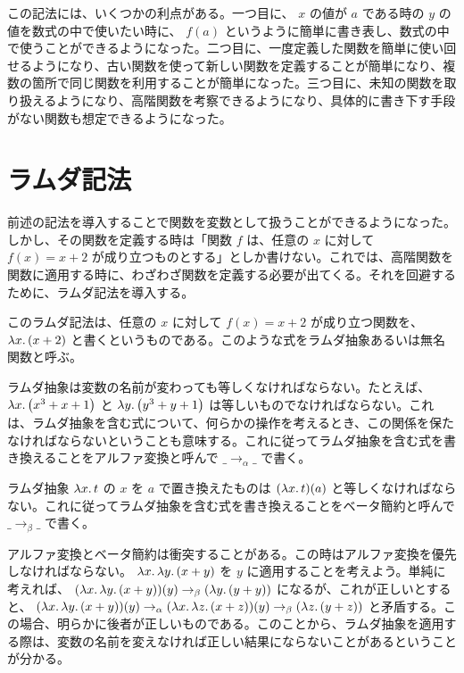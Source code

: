 \documentclass[book]{jlreq}
\newcommand{\p}[1]{ \mathord{ \left( #1 \right) } }
\begin{document}
この記法には、いくつかの利点がある。一つ目に、 \( x \) の値が \( a \) である時の \( y \) の値を数式の中で使いたい時に、 \( f \p{ a } \) というように簡単に書き表し、数式の中で使うことができるようになった。二つ目に、一度定義した関数を簡単に使い回せるようになり、古い関数を使って新しい関数を定義することが簡単になり、複数の箇所で同じ関数を利用することが簡単になった。三つ目に、未知の関数を取り扱えるようになり、高階関数を考察できるようになり、具体的に書き下す手段がない関数も想定できるようになった。

\section{ラムダ記法}

前述の記法を導入することで関数を変数として扱うことができるようになった。しかし、その関数を定義する時は「関数 \( f \) は、任意の \( x \) に対して \( f \p{ x } = x + 2 \) が成り立つものとする」としか書けない。これでは、高階関数を関数に適用する時に、わざわざ関数を定義する必要が出てくる。それを回避するために、ラムダ記法を導入する。

このラムダ記法は、任意の \( x \) に対して \( f \p{ x } = x + 2 \) が成り立つ関数を、 \( \lambda x \ldotp \p{ x + 2 } \) と書くというものである。このような式をラムダ抽象あるいは無名関数と呼ぶ。

ラムダ抽象は変数の名前が変わっても等しくなければならない。たとえば、 \( \lambda x \ldotp \p{ x^3 + x + 1 } \) と \( \lambda y \ldotp \p{ y^3 + y + 1 } \) は等しいものでなければならない。これは、ラムダ抽象を含む式について、何らかの操作を考えるとき、この関係を保たなければならないということも意味する。これに従ってラムダ抽象を含む式を書き換えることをアルファ変換と呼んで \( \_ \rightarrow_\alpha \_ \) で書く。

ラムダ抽象 \( \lambda x \ldotp t \) の \( x \) を \( a \) で置き換えたものは \( \p{ \lambda x \ldotp t } \p{ a } \) と等しくなければならない。これに従ってラムダ抽象を含む式を書き換えることをベータ簡約と呼んで \( \_ \rightarrow_\beta \_ \) で書く。

アルファ変換とベータ簡約は衝突することがある。この時はアルファ変換を優先しなければならない。 \( \lambda x \ldotp \lambda y \ldotp \p{ x + y } \) を \( y \) に適用することを考えよう。単純に考えれば、 \( \p{ \lambda x \ldotp \lambda y \ldotp \p{ x + y } } \p{ y } \rightarrow_\beta \p{ \lambda y \ldotp \p{ y + y } } \) になるが、これが正しいとすると、 \( \p{ \lambda x \ldotp \lambda y \ldotp \p{ x + y } } \p{ y } \rightarrow_\alpha \p{ \lambda x \ldotp \lambda z \ldotp \p{ x + z } } \p{ y } \rightarrow_\beta \p{ \lambda z \ldotp \p{ y + z } } \) と矛盾する。この場合、明らかに後者が正しいものである。このことから、ラムダ抽象を適用する際は、変数の名前を変えなければ正しい結果にならないことがあるということが分かる。
\end{document}
